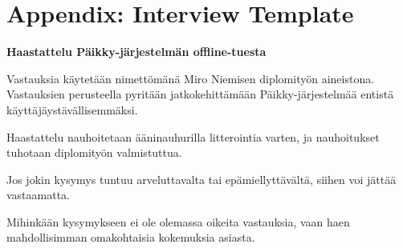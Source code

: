 
\chapter{Appendix: Interview Template}

\textbf{Haastattelu Päikky-järjestelmän offline-tuesta}

Vastauksia käytetään nimettömänä Miro Niemisen diplomityön aineistona. Vastauksien perusteella pyritään jatkokehittämään Päikky-järjestelmää entistä käyttäjäystävällisemmäksi. 

Haastattelu nauhoitetaan ääninauhurilla litterointia varten, ja nauhoitukset tuhotaan diplomityön valmistuttua. 

Jos jokin kysymys tuntuu arveluttavalta tai epämiellyttävältä, siihen voi jättää vastaamatta. 

Mihinkään kysymykseen ei ole olemassa oikeita vastauksia, vaan haen mahdollisimman omakohtaisia kokemuksia asiasta.

